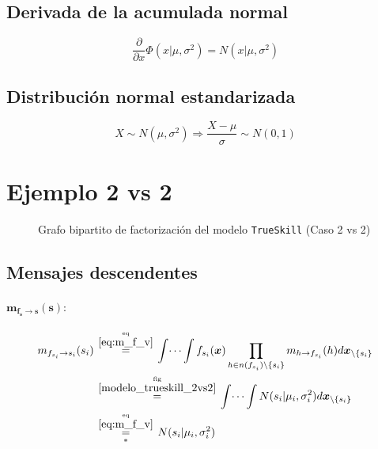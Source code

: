 \documentclass[article]{jss}
\newcommand\hfrac[2]{\genfrac{}{}{0pt}{}{#1}{#2}} %
\begin{document}
\begin{appendix}
\subsection*{Derivada de la acumulada normal}
\begin{equation}\label{eq:phi_norm}
 \frac{\partial}{\partial x} \Phi(x|\mu,\sigma^2) = N(x|\mu,\sigma^2)
\end{equation}

\subsection*{Distribuci\'on normal estandarizada}
\begin{equation}\label{eq:estandarizar}
 X \sim N(\mu,\sigma^2) \Rightarrow \frac{X-\mu}{\sigma} \sim N(0,1)
\end{equation}



\section{Ejemplo 2 vs 2}

\begin{figure}[t!]
  \centering
  \scalebox{.75}{}
  \caption{\small Grafo bipartito de factorizaci\'on del modelo \texttt{TrueSkill} (Caso 2 vs 2)}
  \label{modelo_trueskill_2vs2}
\end{figure}


\subsection{Mensajes descendentes}

\paragraph{$\bm{m_{f_s \rightarrow s}(s)}:$}

\begin{equation}\label{eq:m_fs_s}
\begin{split}
 m_{f_{s_i} \rightarrow s_i}(s_i) & \overset{\hfrac{\text{eq}}{\ref{eq:m_f_v}}}{=} \int \dots \int f_{s_i}(\bm{x}) \prod_{h \in n(f_{s_i}) \setminus \{s_i\} } m_{h \rightarrow f_{s_i}}(h) d\bm{x}_{\setminus \{s_i\}}  \\
& \overset{\hfrac{\text{fig}}{\ref{modelo_trueskill_2vs2}}}{=} \int \dots \int N(s_i| \mu_i, \sigma_i^2) d\bm{x}_{\setminus \{s_i\} } \\
& \underset{*}{\overset{\hfrac{\text{eq}}{\ref{eq:m_f_v}}}{=}} N(s_i| \mu_i, \sigma_i^2)
\end{split}
\end{equation}


\end{appendix}
\end{document}
